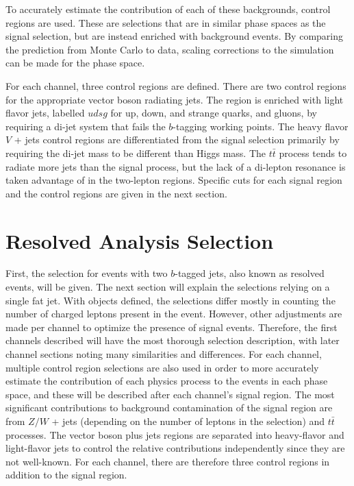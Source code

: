 To accurately estimate the contribution of each of these backgrounds,
control regions are used.
These are selections that are in similar phase spaces as the signal selection,
but are instead enriched with background events.
By comparing the prediction from Monte Carlo to data,
scaling corrections to the simulation can be made for the phase space.

For each channel, three control regions are defined.
There are two control regions for the appropriate vector boson radiating jets.
The region is enriched with light flavor jets, labelled $udsg$ for
up, down, and strange quarks, and gluons, by requiring a di-jet system that fails
the $b$-tagging working points.
The heavy flavor $V$ + jets control regions are differentiated from the signal selection
primarily by requiring the di-jet mass to be different than Higgs mass.
The $t\bar{t}$ process tends to radiate more jets than the signal process,
but the lack of a di-lepton resonance is taken advantage of in the two-lepton regions.
Specific cuts for each signal region and the control regions are given in the next section.

\section{Resolved Analysis Selection}

First, the selection for events with two $b$-tagged jets,
also known as resolved events, will be given.
The next section will explain the selections relying on a single fat jet.
With objects defined, the selections differ mostly in counting the number
of charged leptons present in the event.
However, other adjustments are made per channel to optimize the presence of signal events.
Therefore, the first channels described will have the most thorough selection description,
with later channel sections noting many similarities and differences.
For each channel,
multiple control region selections are also used in order to more accurately
estimate the contribution of each physics process to the events in each phase space,
and these will be described after each channel's signal region.
The most significant contributions to background contamination of the signal region are from
$Z/W$ + jets (depending on the number of leptons in the selection) and $t\bar{t}$ processes.
The vector boson plus jets regions are separated into heavy-flavor and light-flavor jets
to control the relative contributions independently since they are not well-known.
For each channel, there are therefore three control regions in addition to the signal region.

